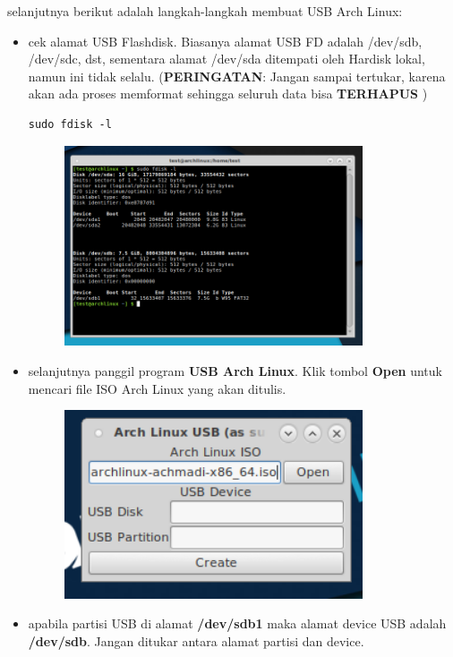 \documentclass[12pt,]{article}
\begin{document}
	selanjutnya berikut adalah langkah-langkah membuat USB Arch Linux:
	\begin{itemize}
		\item cek alamat USB Flashdisk.
		Biasanya alamat USB FD adalah /dev/sdb, /dev/sdc, dst, sementara alamat /dev/sda ditempati oleh Hardisk lokal, namun ini tidak selalu.
		(\textbf{PERINGATAN}: Jangan sampai tertukar, karena akan ada proses memformat sehingga seluruh data bisa \textbf{TERHAPUS} )
		
		\begin{verbatim}
sudo fdisk -l
		\end{verbatim} 
		
		\newpage
		\begin{figure}[h]
			\centering
			\includegraphics[width=250pt]{usbarch/usb}
		\end{figure}
	
		\item selanjutnya panggil program \textbf{USB Arch Linux}.
		Klik tombol \textbf{Open} untuk mencari file ISO Arch Linux yang akan ditulis.
		
		\begin{figure}[h]
			\centering
			\includegraphics[width=250pt]{usbarch/step_1}
		\end{figure}
	
		\item apabila partisi USB di alamat \textbf{/dev/sdb1} maka alamat device USB adalah \textbf{/dev/sdb}.
		Jangan ditukar antara alamat partisi dan device.
		

\end{itemize}
\end{document}
